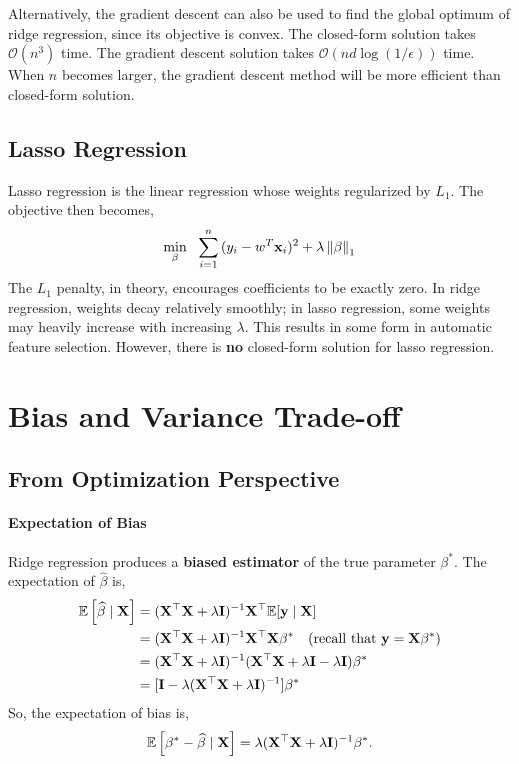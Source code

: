 Alternatively, the gradient descent can also be used to find the global optimum of ridge regression, since its objective is convex.
The closed-form solution takes $\mathcal{O}(n^3)$ time. The gradient descent solution takes $\mathcal{O}(n d \log (1 / {\epsilon}))$ time.
When $n$ becomes larger, the gradient descent method will be more efficient than closed-form solution.

\subsection{Lasso Regression}
Lasso regression is the linear regression whose weights regularized by $L_1$. The objective then becomes,
\begin{equation*}
\min_{{\beta}}\ \ {
	\sum_{i=1}^n{(y_i - {w}^T {\bfx}_i)^2
		+ \lambda \norm{{\beta}}_1
}}
\end{equation*}
The $L_1$ penalty, in theory, encourages coefficients to be
exactly zero. In ridge regression, weights decay relatively smoothly;
in lasso regression, some weights may heavily increase
with increasing $\lambda$. This results in some form in automatic feature selection. However, there is \textbf{no} closed-form solution for lasso regression.


\section{Bias and Variance Trade-off}
\subsection{From Optimization Perspective}
\paragraph{Expectation of Bias} Ridge regression produces a \textbf{biased estimator} of the true parameter $\beta^*$. 
The expectation of $\widehat{\beta}$ is,
\begin{align}
	\mathbb{E}\left[ \widehat{\beta} \mid \mathbf{X} \right] & =  (\mathbf{X} ^\top \mathbf{X} + \lambda \mathbf{I} )^{-1} \mathbf{X}^\top \mathbb{E} [\mathbf{y}\mid \mathbf{X}] \\
	& = (\mathbf{X} ^\top \mathbf{X} + \lambda \mathbf{I} )^{-1} \mathbf{X}^\top \mathbf{X} \beta^* \quad \mathrm{(recall\ that } \ \mathbf{y} = \mathbf{X} \beta^* \mathrm{)} \\
	& = (\mathbf{X} ^\top \mathbf{X} + \lambda \mathbf{I} )^{-1} (\mathbf{X}^\top \mathbf{X} + \lambda \mathbf{I} - \lambda \mathbf{I})\beta^* \\
	& = [\mathbf{I} - \lambda (\mathbf{X} ^\top \mathbf{X} + \lambda \mathbf{I} )^{-1}] \beta^*
\end{align}
So, the expectation of bias is,
\begin{equation}
	\mathbb{E}\left[ \beta^* - \widehat{\beta} \mid \mathbf{X} \right] = \lambda (\mathbf{X} ^\top \mathbf{X} + \lambda \mathbf{I} )^{-1} \beta^*.
\end{equation}

